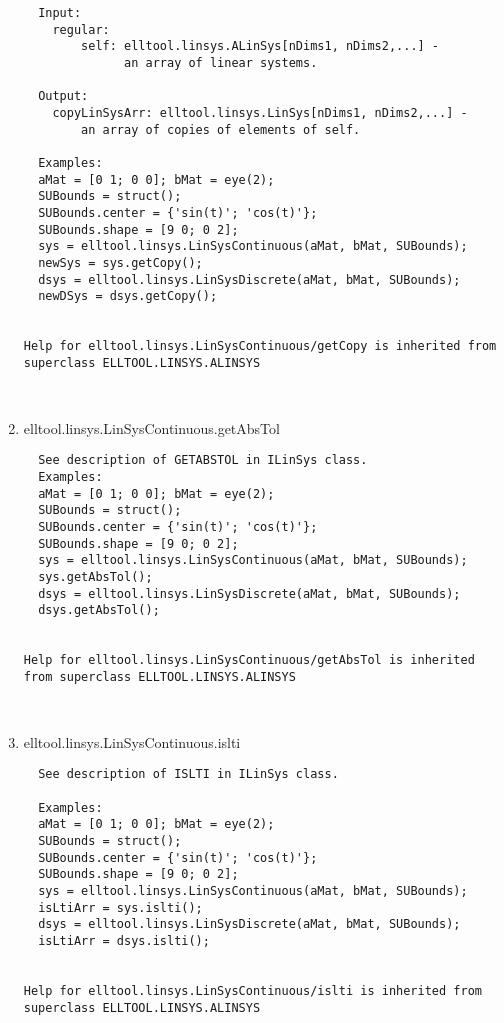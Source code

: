 \begin{enumerate}
\begin{lstlisting}
  Input:
    regular:
        self: elltool.linsys.ALinSys[nDims1, nDims2,...] -
              an array of linear systems.

  Output:
    copyLinSysArr: elltool.linsys.LinSys[nDims1, nDims2,...] -
        an array of copies of elements of self.

  Examples:
  aMat = [0 1; 0 0]; bMat = eye(2);
  SUBounds = struct();
  SUBounds.center = {'sin(t)'; 'cos(t)'};
  SUBounds.shape = [9 0; 0 2];
  sys = elltool.linsys.LinSysContinuous(aMat, bMat, SUBounds);
  newSys = sys.getCopy();
  dsys = elltool.linsys.LinSysDiscrete(aMat, bMat, SUBounds);
  newDSys = dsys.getCopy();


Help for elltool.linsys.LinSysContinuous/getCopy is inherited from superclass ELLTOOL.LINSYS.ALINSYS



\end{lstlisting}
\fontfamily{\familydefault}
\selectfont
\item {elltool.linsys.LinSysContinuous.getAbsTol}
\selectfont
\begin{lstlisting}
  See description of GETABSTOL in ILinSys class.
  Examples:
  aMat = [0 1; 0 0]; bMat = eye(2);
  SUBounds = struct();
  SUBounds.center = {'sin(t)'; 'cos(t)'};
  SUBounds.shape = [9 0; 0 2];
  sys = elltool.linsys.LinSysContinuous(aMat, bMat, SUBounds);
  sys.getAbsTol();
  dsys = elltool.linsys.LinSysDiscrete(aMat, bMat, SUBounds);
  dsys.getAbsTol();


Help for elltool.linsys.LinSysContinuous/getAbsTol is inherited from superclass ELLTOOL.LINSYS.ALINSYS



\end{lstlisting}
\fontfamily{\familydefault}
\selectfont
\item {elltool.linsys.LinSysContinuous.islti}
\selectfont
\begin{lstlisting}
  See description of ISLTI in ILinSys class.

  Examples:
  aMat = [0 1; 0 0]; bMat = eye(2);
  SUBounds = struct();
  SUBounds.center = {'sin(t)'; 'cos(t)'};
  SUBounds.shape = [9 0; 0 2];
  sys = elltool.linsys.LinSysContinuous(aMat, bMat, SUBounds);
  isLtiArr = sys.islti();
  dsys = elltool.linsys.LinSysDiscrete(aMat, bMat, SUBounds);
  isLtiArr = dsys.islti();


Help for elltool.linsys.LinSysContinuous/islti is inherited from superclass ELLTOOL.LINSYS.ALINSYS




\end{lstlisting}
\end{enumerate}
